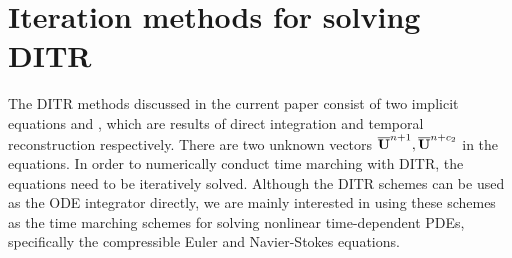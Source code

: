 



\section{Iteration methods for solving DITR}
\label{sec:Solving}

The DITR methods discussed in the current paper
consist of two implicit equations  and
, which are results of direct integration
and temporal reconstruction respectively.
There are two unknown vectors $\overline{\mathbf{U}}^{n+1},\overline{\mathbf{U}}^{n+c_2}$ in the equations.
In order to numerically conduct time marching with DITR, the equations
need to be iteratively solved.
Although the DITR schemes can be used as the ODE integrator
directly, we are mainly interested in using these schemes
as the time marching schemes for solving nonlinear time-dependent
PDEs, specifically the compressible Euler and Navier-Stokes equations.



